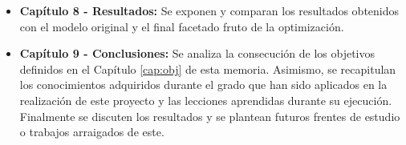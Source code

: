 \begin{itemize}
    \item \textbf{Capítulo 8 - Resultados:} Se exponen y comparan los resultados obtenidos con el modelo original y el final facetado fruto de la optimización.
    \item \textbf{Capítulo 9 - Conclusiones:} Se analiza la consecución de los objetivos definidos en el Capítulo \ref{cap:obj} de esta memoria. Asimismo, se recapitulan los conocimientos adquiridos durante el grado que han sido aplicados en la realización de este proyecto y las lecciones aprendidas durante su ejecución. Finalmente se discuten los resultados y se plantean futuros frentes de estudio o trabajos arraigados de este.

\end{itemize}

